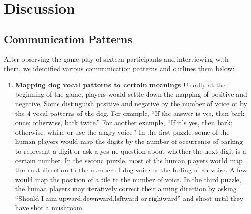 \documentclass{sigchi}
\begin{document}
\section{Discussion}
\subsection{Communication Patterns}
After observing the game-play of sixteen participants and interviewing with them, we identified various communication patterns and outlines them below:
\begin{enumerate}
\item \textbf{Mapping dog vocal patterns to certain meanings}\newline
Usually at the beginning of the game, players would settle down the mapping of positive and negative.
Some distinguish positive and negative by the number of voice or by the 4 vocal patterns of the dog.
For example, ``If the answer is yes, then bark once; otherwise, bark twice.''
For another example, ``If it's yes, then bark; otherwise, whine or use the angry voice.''
In the first puzzle, some of the human players would map the digits by the number of occurrence of barking to represent a digit or ask a yes-no question about whether the next digit is a certain number.
In the second puzzle, most of the human players would map the next direction to the number of dog voice or the feeling of an voice.
A few would map the position of a tile to the number of voice.
In the third puzzle, the human players may iteratively correct their aiming direction by asking ``Should I aim upward,downward,leftward or rightward'' and shoot until they have shot a mushroom.


\end{enumerate}
\end{document}

